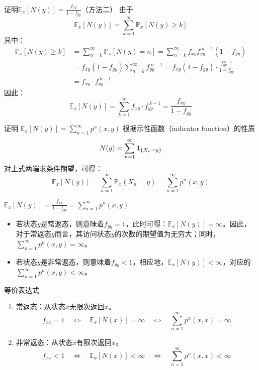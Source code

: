 \documentclass[t]{beamer}
\renewcommand{\Pr}{\mathbb{P}}
\newcommand{\E}{\mathbb{E}}
\begin{document}
\begin{frame}{证明$\E_x[N(y)]=\frac{f_{xy}}{1-f_{yy}}$（方法二）}
   由于 \[\E_x[N(y)]=\sum_{k=1}^{\infty} \Pr_x[N(y)\ge k] \]
    其中：
    \[\begin{split}
    \Pr_x[N(y)\ge k]&=\sum^{\infty}_{n=k} \Pr_x[N(y)=n]=\sum^{\infty}_{n=k} f_{xy}f^{\;n-1}_{yy}(1-f_{yy})\\
    &=f_{xy}(1-f_{yy})\sum^{\infty}_{n=k} f^{\;n-1}_{yy}=f_{xy}(1-f_{yy})\cdot \frac{f^{\;k-1}_{yy}}{1-f_{yy}}\\
    &=f_{xy}\cdot f^{\;k-1}_{yy}
    \end{split}\]
    因此：
    \[\E_x[N(y)]=\sum_{k=1}^{\infty}f_{xy}\cdot f^{\;k-1}_{yy}=\frac{f_{xy}}{1-f_{yy}}  \]
\end{frame}


\begin{frame}{证明
    $\E_x[N(y)]=\sum^{\infty}_{n=1} p^n(x,y)$}
    根据示性函数（indicator function）的性质
    \[N(y)=\sum_{n=1}^{\infty}{\bf 1}_{\{X_n=y\}} \]
    对上式两端求条件期望，可得：
    \[\E_x[ N(y)]=\sum_{n=1}^{\infty}\Pr_{x}(X_n=y)=\sum_{n=1}^{\infty} p^n(x,y)\]
\end{frame}


\begin{frame}{$\E_x[N(y)]=\frac{f_{xy}}{1-f_{yy}}=\sum^{\infty}_{n=1} p^n(x,y)$}
    \begin{itemize}
        \item  若状态$y$是常返态，则意味着$f_{yy}=1$，此时可得：$\E_x[N(y)]=\infty$。因此，对于常返态$y$而言，其访问状态$y$的次数的期望值为无穷大；同时，$\displaystyle\sum^{\infty}_{n=1} p^n(x,y)=\infty$。
        \item 若状态$y$是非常返态，则意味着$f_{yy}<1$，相应地，$\E_x[N(y)]<\infty$，对应的$\displaystyle\sum^{\infty}_{n=1} p^n(x,y)<\infty$。
    \end{itemize}
   

    
\end{frame}

\begin{frame}{等价表达式}
    \begin{enumerate}
        \item 常返态：从状态$x$无限次返回$x$。
        \[f_{xx}=1   \quad\Longleftrightarrow\quad   \E_x[N(x)]=\infty \quad\Longleftrightarrow\quad  \sum^{\infty}_{n=1} p^n(x,x)=\infty \] 
        \item 非常返态：从状态$x$有限次返回$x$。
        \[f_{xx}<1   \quad\Longleftrightarrow\quad   \E_x[N(x)]<\infty \quad\Longleftrightarrow\quad \sum^{\infty}_{n=1} p^n(x,x)<\infty \] 
        \end{enumerate}
\end{frame}
\end{document}
